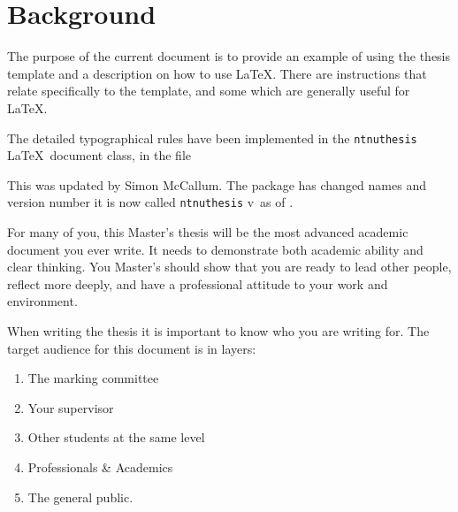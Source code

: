 \chapter{Background}
\label{chap:background}
The purpose of the current document is to provide an example of using the thesis template and a description on how to use \LaTeX. There are instructions that relate specifically to the template, and some which are generally useful for \LaTeX. 

The detailed typographical rules have been implemented in the
\texttt{ntnuthesis} \LaTeX\ document class, in the file 

This was updated by Simon McCallum.
The package has changed names and version number it is now called
\texttt{ntnuthesis}
v\ntnuthesisversion\ as of \ntnuthesisdate.

For many of you, this Master's thesis will be the most advanced academic document you ever write.  It needs to demonstrate both academic ability and clear thinking. You Master's should show that you are ready to lead other people, reflect more deeply, and have a professional attitude to your work and environment. 

When writing the thesis it is important to know who you are writing for. The target audience for this document is in layers:
\begin{enumerate}
    \item The marking committee
    \item Your supervisor
    \item Other students at the same level 
    \item Professionals \& Academics
    \item The general public.
\end{enumerate}
